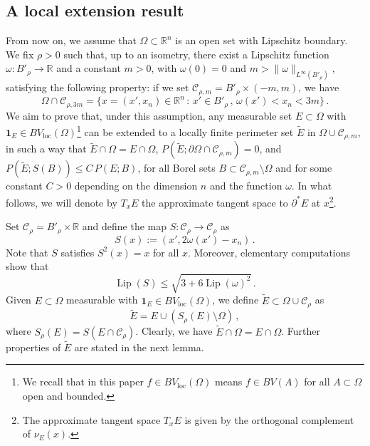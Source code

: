 \documentclass[a4paper,reqno,11pt]{amsart}
\newcommand{\R}{\mathbb{R}}
\newcommand{\ra}{\rightarrow}
\newcommand{\de}{\partial}
\newcommand{\loc}{\mathop{\mathrm{loc}}}
\newcommand{\ch}{\mathbf{1}}
\newcommand{\cC}{\mathcal{C}}
\newcommand{\Lip}{\mathop{\mathrm{Lip}}}
\begin{document}
\subsection{A local extension result}
	From now on, we assume that $\Omega \subset \R^{n}$ is an open set with Lipschitz boundary. We fix $\rho>0$ such that, up to an isometry, there exist a Lipschitz function $\omega: B'_{\rho} \rightarrow \R$ and a constant $m>0$, with $\omega(0) = 0$ and $m > \|\omega\|_{L^{\infty}(B'_{\rho})}$, satisfying the following property: if we set $\cC_{\rho,m} = B'_{\rho} \times (-m,m)$, we have
	\begin{equation} \label{eq:omegagraph}
		\Omega \cap \cC_{\rho,3m} = \{ x=(x',x_{n}) \in \R^{n} \, : \, x' \in B'_{\rho} \, , \, \omega(x') < x_{n} < 3m \} \, .
	\end{equation}
We aim to prove that, under this assumption, any measurable set $E \subset \Omega$ with $\ch_E \in BV_{\loc}(\Omega)$\footnote{We recall that in this paper $f\in BV_{\loc}(\Omega)$ means $f\in BV(A)$ for all $A\subset \Omega$ open and bounded.} can be extended to a locally finite perimeter set $\tilde{E}$ in  $\Omega\cup\cC_{\rho,m}$, in such a way that $\tilde E \cap \Omega = E\cap \Omega$, $P(\tilde E; \partial \Omega\cap \cC_{\rho,m}) = 0$, and $P(\tilde E;S(B)) \le C\, P(E;B)$, for all Borel sets $B\subset \cC_{\rho,m}\setminus \Omega$ and for some constant $C>0$ depending on the dimension $n$ and the function $\omega$. In what follows, we will denote by $T_{x} E$ the approximate tangent space to $\de^\ast E$ at $x$\footnote{The approximate tangent space $T_{x} E$ is given by the orthogonal complement of $\nu_{E}(x)$.}.
    
Set $\cC_{\rho} = B'_{\rho}\times \R$ and define the map $S : \cC_{\rho} \ra \cC_{\rho}$ as
\begin{equation}\label{eq:Ssymmetry}
S(x) := (x', 2 \omega(x') - x_n) \, .
\end{equation}
Note that $S$ satisfies $S^{2}(x) =x$ for all $x$. Moreover, elementary computations show that 
\begin{equation}\label{eq:lipS}
\Lip(S) \le \sqrt{3+6\Lip(\omega)^{2}}\,.
\end{equation}
Given $E\subset \Omega$ measurable with $\ch_E \in BV_{\loc}(\Omega)$, we define $\tilde E \subset \Omega\cup \cC_{\rho}$ as
\begin{equation}\label{eq:tildeE}
\tilde E = E \cup (S_{\rho}(E)\setminus \Omega)\,,
\end{equation}
where $S_{\rho}(E) = S(E\cap \cC_{\rho})$. Clearly, we have $\tilde E\cap \Omega = E\cap \Omega$. 
Further properties of $\tilde E$ are stated in the next lemma.
\end{document}
